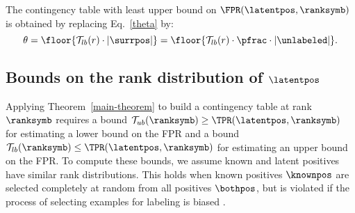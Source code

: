 The contingency table with least upper bound on $\FPR(\latentpos,\ranksymb)$ is obtained by replacing Eq.~\eqref{theta} by:
\begin{equation}
\theta = \floor{\mathcal{T}_{lb}(r) \cdot |\surrpos|} = \floor{\mathcal{T}_{lb}(r) \cdot \pfrac \cdot |\unlabeled|}. \label{theta-alt}
\end{equation}



\subsection{Bounds on the rank distribution of $\latentpos$} \label{quantile-bounds}
Applying Theorem~\ref{main-theorem} to build a contingency table at rank $\ranksymb$ requires a bound $\mathcal{T}_{ub}(\ranksymb) \geq \TPR(\latentpos, \ranksymb)$ for estimating a lower bound on the FPR and a bound $\mathcal{T}_{lb}(\ranksymb) \leq \TPR(\latentpos, \ranksymb)$  for estimating an upper bound on the FPR. To compute these bounds, we assume known and latent positives have similar rank distributions. This holds when known positives $\knownpos$ are selected completely at random from all positives $\bothpos$, but is violated if the process of selecting examples for labeling is biased \citep{chawla2005learning}. %


